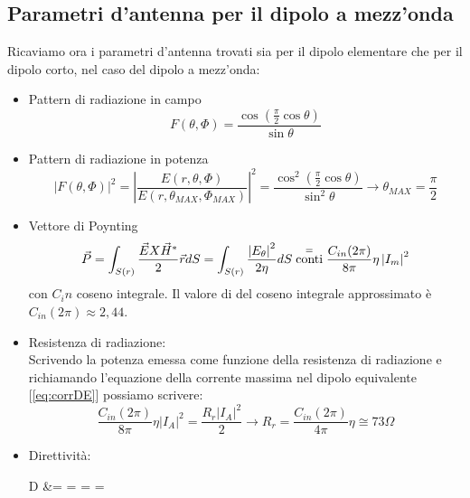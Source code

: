\subsection{Parametri d'antenna per il dipolo a mezz'onda}
Ricaviamo ora i parametri d'antenna trovati sia per il dipolo elementare che per il dipolo corto, nel caso del dipolo a mezz'onda:
\begin{itemize}
  \item Pattern di radiazione in campo
    \begin{equation}
      F(\theta, \Phi) = \frac{\cos \left(\frac{\pi}{2} \cos \theta \right)}{\sin \theta}
    \end{equation}

  \item Pattern di radiazione in potenza
    \begin{equation}
      \left | F(\theta, \Phi) \right |^2 = \left | \frac{E(r, \theta, \Phi)}{E(r, \theta_{MAX}, \Phi_{MAX})} \right |^2 = \frac{\cos^2 \left(\frac{\pi}{2} \cos \theta \right)}{\sin^2 \theta} \to \theta_{MAX} = \frac{\pi}{2}
    \end{equation}
  \item Vettore di Poynting
    \begin{equation}
      \vec{P} = \int_{S(r)} \frac{\vec{E} X \vec{H}^*}{2} \vec{r} dS = \int_{S(r)} \frac{\left | E_{\theta} \right |^2}{2 \eta} dS  \stackrel{=}{\text{conti}} \frac{C_{in} (2 \pi)}{8 \pi} \eta \left | I_m \right |^2
    \end{equation}
    con $C_in$ coseno integrale. Il valore di del coseno integrale approssimato è $C_{in}(2 \pi) \approx 2,44$.
    \item Resistenza di radiazione: \\
      Scrivendo la potenza emessa come funzione della resistenza di radiazione e richiamando l'equazione della corrente massima nel dipolo equivalente [\eqref{eq:corrDE}] possiamo scrivere:
      \begin{equation}
        \frac{C_{in} (2 \pi)}{8 \pi} \eta \left | I_A \right |^2 = \frac{R_r \left | I_A \right |^2}{2} \to R_r = \frac{C_{in} (2 \pi)}{4 \pi} \eta \cong 73 \Omega
      \end{equation}
    \item Direttività:
      \begin{esp}
        D &=  =  =  =  \\

\end{esp}
\end{itemize}
